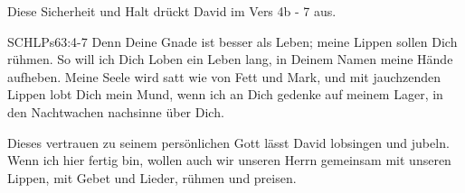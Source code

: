 \documentclass[14pt]{../../inc/mybib}
\begin{document}
    \begin{block}
        Diese Sicherheit und Halt drückt David im Vers 4b - 7 aus.
        \begin{bibelbox}{SCHL}{Ps}{63:4-7}
            Denn Deine Gnade ist besser als Leben; meine Lippen sollen Dich rühmen. So will ich Dich Loben ein Leben lang, in Deinem Namen meine Hände aufheben. Meine Seele wird satt wie von Fett und Mark, und mit jauchzenden Lippen lobt Dich mein Mund, wenn ich an Dich gedenke auf meinem Lager, in den Nachtwachen nachsinne über Dich.
        \end{bibelbox}
        Dieses vertrauen zu seinem persönlichen Gott lässt David lobsingen und jubeln.
        Wenn ich hier fertig bin, wollen auch wir unseren Herrn gemeinsam mit unseren Lippen, mit Gebet und Lieder, rühmen und preisen.
    \end{block}    
\end{document}
